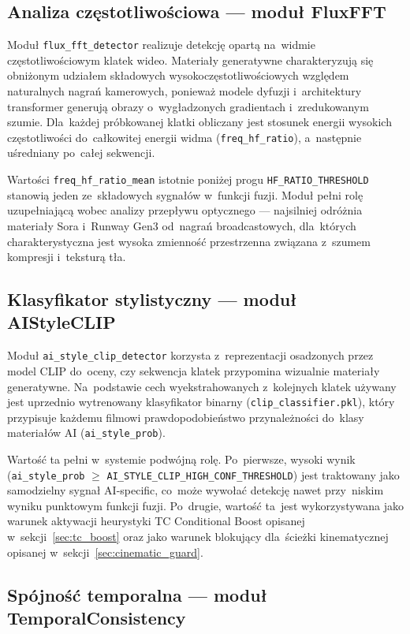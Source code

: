 \subsection*{Analiza częstotliwościowa --- moduł FluxFFT}

Moduł \texttt{flux\_fft\_detector} realizuje detekcję opartą na~widmie
częstotliwościowym klatek wideo. Materiały generatywne charakteryzują się
obniżonym udziałem składowych wysokoczęstotliwościowych względem naturalnych
nagrań kamerowych, ponieważ modele dyfuzji i~architektury transformer
generują obrazy o~wygładzonych gradientach i~zredukowanym szumie.
Dla~każdej próbkowanej klatki obliczany jest stosunek energii wysokich
częstotliwości do~całkowitej energii widma (\texttt{freq\_hf\_ratio}),
a~następnie uśredniany po~całej sekwencji.

Wartości \texttt{freq\_hf\_ratio\_mean} istotnie poniżej progu
\texttt{HF\_RATIO\_THRESHOLD} stanowią jeden ze~składowych sygnałów
w~funkcji fuzji. Moduł pełni rolę uzupełniającą wobec analizy przepływu
optycznego --- najsilniej odróżnia materiały Sora i~Runway Gen3 od~nagrań
broadcastowych, dla~których charakterystyczna jest wysoka zmienność
przestrzenna związana z~szumem kompresji i~teksturą tła.

\subsection*{Klasyfikator stylistyczny --- moduł AIStyleCLIP}

Moduł \texttt{ai\_style\_clip\_detector} korzysta z~reprezentacji osadzonych
przez model CLIP do~oceny, czy sekwencja klatek przypomina wizualnie
materiały generatywne. Na~podstawie cech wyekstrahowanych z~kolejnych klatek
używany jest uprzednio wytrenowany klasyfikator binarny (\texttt{clip\_classifier.pkl}),
który przypisuje każdemu filmowi prawdopodobieństwo przynależności
do~klasy materiałów AI (\texttt{ai\_style\_prob}).

Wartość ta pełni w~systemie podwójną rolę. Po~pierwsze, wysoki wynik
(\texttt{ai\_style\_prob} $\geq$ \texttt{AI\_STYLE\_CLIP\_HIGH\_CONF\_THRESHOLD})
jest traktowany jako samodzielny sygnał AI-specific, co~może wywołać
detekcję nawet przy~niskim wyniku punktowym funkcji fuzji.
Po~drugie, wartość ta~jest wykorzystywana jako warunek aktywacji
heurystyki TC Conditional Boost opisanej w~sekcji~\ref{sec:tc_boost}
oraz jako warunek blokujący dla~ścieżki kinematycznej opisanej
w~sekcji~\ref{sec:cinematic_guard}.

\subsection*{Spójność temporalna --- moduł TemporalConsistency}

